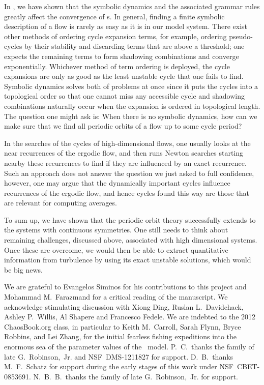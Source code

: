 \documentclass[aip,cha,
reprint,
secnumarabic,
nofootinbib, tightenlines,
nobibnotes, showkeys, showpacs,
superscriptaddress,
]{revtex4-1}
\begin{document}
{In , we have shown that the symbolic dynamics 
and the associated grammar rules greatly affect the convergence of 
\cycForm s. In general, finding a finite symbolic description of 
a flow is rarely as easy as it is in our model system. There exist 
other methods of ordering cycle expansion terms, for example, 
ordering pseudo-cycles by their stability and discarding terms 
that are above a threshold; one expects the remaining 
terms to form shadowing combinations and converge exponentially. 
Whichever method of term ordering is deployed, the cycle 
expansions are only as good as the least unstable cycle that one 
fails to find. Symbolic dynamics solves both of problems at once 
since it puts the cycles into a topological order so that one 
cannot miss any accessible cycle and shadowing combinations 
naturally occur when the expansion is ordered in topological 
length. The question one might ask is: When there is no symbolic 
dynamics, how can we make sure that we find all periodic orbits of 
a flow up to some cycle period?

In the searches of the cycles of high-dimensional flows, one 
usually looks at the near recurrences of the ergodic flow, and 
then runs Newton searches starting nearby these recurrences to 
find if they are influenced by an exact recurrence. Such an 
approach does not answer the question we just asked to full 
confidence, however, one may argue that the dynamically important 
cycles influence recurrences of the ergodic flow, and hence cycles 
found this way are those that are relevant for computing averages.

To sum up, we have shown that the periodic orbit theory 
successfully extends to the systems with continuous symmetries. 
One still needs to think about remaining challenges, discussed 
above, associated with high dimensional systems. Once these are 
overcome, we would then be able to extract quantitative 
information from turbulence by using its exact unstable solutions, 
which would be big news.

\begin{acknowledgments}
We are grateful to Evangelos Siminos for his contributions to this project
and Mohammad M.~Farazmand for a critical reading of the manuscript.
We acknowledge stimulating discussion with
Xiong Ding,
Ruslan L.~Davidchack,
Ashley P.~Willis,
Al Shapere
and
Francesco Fedele.
We are indebted to the 2012 ChaosBook.org class, in particular to
Keith M.~Carroll,
Sarah Flynn,
Bryce Robbins,
and
Lei Zhang,
for the initial fearless fishing expeditions into the enormous sea of the
parameter values of the \twomode\ model.
P.~C.\ thanks the family of late G.~Robinson,~Jr.
and
NSF~DMS-1211827 for support. D.~B.\ thanks M.~F.\ Schatz for support during
the early stages of this work under NSF~CBET-0853691.
N.~B.~B.\ thanks the family of late G.~Robinson,~Jr. for support.
\end{acknowledgments}

}
\end{document}
